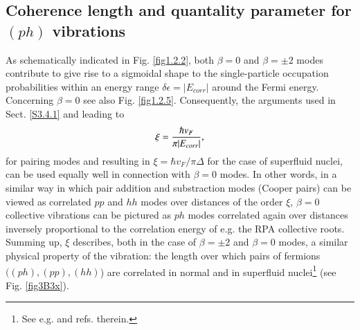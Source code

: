  \subsection{Coherence length and quantality parameter for $(ph)$ vibrations}\label{App4.B.2}
As schematically indicated in Fig. \ref{fig1.2.2}, both $\beta=0$ and $\beta=\pm2$ modes contribute to give rise to a sigmoidal shape to the single-particle occupation probabilities within an energy range $\delta\epsilon=|E_{corr}|$ around the Fermi energy. Concerning $\beta=0$ see also Fig. \ref{fig1.2.5}. Consequently, the arguments used in Sect. \ref{S3.4.1} and leading to 
\begin{align}\label{eq3.B.12}
 \xi=\frac{\hbar v_F}{\pi|E_{corr}|}, \idx{Cooper pair!--mean square radius (correlation length)}
 \end{align}
 for pairing modes and resulting in $\xi=\hbar v_F/\pi\Delta$
 for the case of superfluid nuclei, can be used equally well in connection with $\beta=0$ modes. In other words, in a similar way in which pair addition and substraction modes (Cooper pairs) can be viewed as correlated $pp$ and $hh$ modes over distances of the order $\xi$, $\beta=0$ collective vibrations can be pictured as $ph$ modes correlated again over distances inversely proportional to the correlation energy of e.g. the RPA collective roots. Summing up, $\xi$ describes, both in the case of $\beta=\pm2$ and $\beta=0$ modes, a similar  physical property of the vibration: the  length over which  pairs of fermions $((ph),(pp),(hh)$)  are correlated in normal and in superfluid nuclei\footnote{See e.g. \cite{Barranco:19b} and refs. therein.} (see Fig. \ref{fig3B3x}). 

